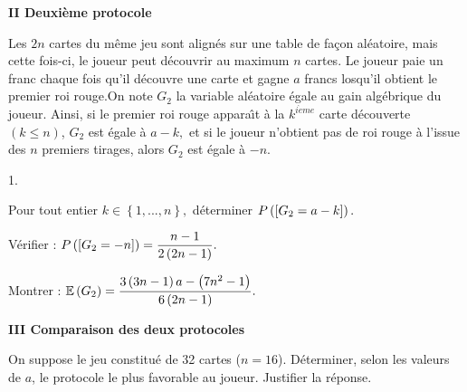 \documentclass[11pt]{article}%
\begin{document}
\begin{center}
\textbf{II Deuxième protocole}
\end{center}

Les $2n$ cartes du même jeu sont alignés sur une table de façon
aléatoire, mais cette fois-ci, le joueur peut découvrir au maximum $n $
cartes. Le joueur paie un franc chaque fois qu'il découvre une carte
et gagne $a$ francs losqu'il obtient le premier roi rouge.On note
$G_{2}$ la
variable aléatoire égale au gain algébrique du joueur. Ainsi, si
le premier roi rouge appara\^{\i}t à la $k^{i\grave{e}me}$ carte
découverte $\left( k\leq n\right) $, $G_{2}$ est égale à $a-k,$
et si le joueur n'obtient pas de roi rouge à l'issue des $n$ premiers
tirages, alors $G_{2}$ est égale à $-n.$

\begin{noliste}{1.}
 \setlength{\itemsep}{4mm}
\item Pour tout entier $k\in \left\{ 1,...,n\right\},$ déterminer
$P\left(\left[ { G_{2} = a-k} \right]\right).$

\item Vérifier : $P\left(\left[ { G_{2} = -n} \right]\right) = \dfrac{n-1}{2\left(
2n-1\right) }.$

\item Montrer : $\mathbb{E}\left( G_{2}\right) = \dfrac{3\left( 3n-1\right)
a-\left(
7n^{2}-1\right) }{6\left( 2n-1\right) }.$
\end{noliste}

\begin{center}
\textbf{III Comparaison des deux protocoles}
\end{center}

On suppose le jeu constitué de 32 cartes ($n = 16$). Déterminer, selon
les valeurs de $a$, le protocole le plus favorable au joueur. Justifier
la réponse.
\end{document}
